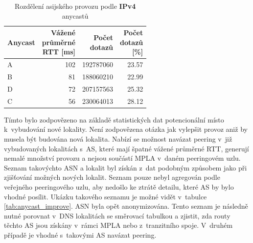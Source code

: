 \documentclass[thesis=M,czech]{src/FITthesis}[2019/12/23]
\begin{document}
\begin{table}
\centering
\begin{tabular}{lrrr}
\toprule
     Anycast  & \makecell{Vážené\\průměrné\\RTT [ms]} &  \makecell{Počet\\dotazů} &  \makecell{Počet\\dotazů\\\ [\%]} \\
\midrule
A~& 102 &   192787060 &         23.57 \\
B &  81 &   188060210 &         22.99 \\
D &  72 &   207157563 &         25.32 \\
C &  56 &   230064013 &         28.12 \\
\bottomrule
\end{tabular}
 	\caption[]{Rozdělení asijského provozu podle \textbf{IPv4} anycastů} 
 	\label{tab:anycast_asia_letters}
\end{table}


Tímto bylo zodpovězeno na základě statistických dat potencionální místo k~vybudování nové lokality. Není zodpovězena otázka jak vylepšit provoz aniž by musela být budována nová lokalita. Nabízí se možnost navázat peering v~již vybudovaných lokalitách s~AS, které mají špatné vážené průměrné RTT, generují nemalé množství provozu a nejsou součástí MPLA v~daném peeringovém uzlu. Seznam takovýchto ASN a lokalit byl získán z~dat podobným způsobem jako při zjišťování možných nových lokalit. Seznam pouze nebyl agregován podle veřejného peeringového uzlu, aby nedošlo ke ztrátě detailu, které AS by bylo vhodné posílit. Ukázku takového seznamu je možné vidět v~tabulce \ref{tab:anycast_improve}. ASN byla opět anonymizována. Tento seznam je následně nutné porovnat v~DNS lokalitách se směrovací tabulkou a zjistit, zda routy těchto AS jsou získány v~rámci MPLA nebo z~tranzitního spoje. V~druhém případě je vhodné s~takovými AS navázat peering.
\end{document}
